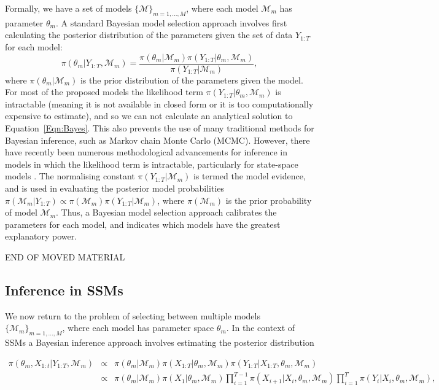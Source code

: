 \documentclass[a4paper,12pt]{article}
\begin{document}
Formally, we have a set of models $\{\mathcal{M}\}_{m=1,...,M}$, where each model $\mathcal{M}_m$ has parameter $\theta_m$.
A standard Bayesian model selection approach involves first calculating the posterior distribution of the parameters given the set of data $Y_{1:T}$ for each model:
\begin{equation} \label{Eqn:Bayes}
\pi(\theta_m \vert Y_{1:T}, \mathcal{M}_m) = \frac{\pi(\theta_m \vert \mathcal{M}_m) \pi(Y_{1:T} \vert \theta_m, \mathcal{M}_m)}{\pi(Y_{1:T} \vert \mathcal{M}_m)},
\end{equation}
\noindent where $\pi(\theta_m \vert \mathcal{M}_m)$ is the prior distribution of the parameters given the model.
For most of the proposed models the likelihood term $\pi(Y_{1:T} \vert \theta_m, \mathcal{M}_m)$ is intractable (meaning it is not available in closed form or it is too computationally expensive to estimate), and so we can not calculate an analytical solution to Equation~\ref{Eqn:Bayes}.
This also prevents the use of many traditional methods for Bayesian inference, such as Markov chain Monte Carlo (MCMC).
However, there have recently been numerous methodological advancements for inference in models in which the likelihood term is intractable, particularly for state-space models \cite{Andrieu2010,Chopin2012}.
The normalising constant $\pi(Y_{1:T} \vert \mathcal{M}_m)$ is termed the model evidence, and is used in evaluating the posterior model probabilities $\pi(\mathcal{M}_m \vert Y_{1:T}) \propto \pi(\mathcal{M}_m) \pi(Y_{1:T} \vert \mathcal{M}_m)$, where $\pi(\mathcal{M}_m)$ is the prior probability of model $\mathcal{M}_m$.
Thus, a Bayesian model selection approach calibrates the parameters for each model, and indicates which models have the greatest explanatory power.

END OF MOVED MATERIAL

\subsection{Inference in SSMs}


We now return to the problem of selecting between multiple models $\{\mathcal{M}_m\}_{m=1,...,M}$, where each model has parameter space $\theta_m$.
In the context of SSMs a Bayesian inference approach involves estimating the posterior distribution

\begin{eqnarray*}
\pi(\theta_m, X_{1:t} \vert Y_{1:T}, \mathcal{M}_m) & \propto & \pi(\theta_m \vert \mathcal{M}_m) \pi(X_{1:T} \vert \theta_m, \mathcal{M}_m) \pi(Y_{1:T} \vert X_{1:T}, \theta_m, \mathcal{M}_m)\\
& \propto & \pi(\theta_m \vert \mathcal{M}_m) \pi(X_1 \vert \theta_m, \mathcal{M}_m) \prod_{i=1}^{T-1} \pi(X_{i+1} \vert X_i, \theta_m, \mathcal{M}_m) \prod_{i=1}^T \pi(Y_i \vert X_i, \theta_m, \mathcal{M}_m),
\end{eqnarray*}
\end{document}

